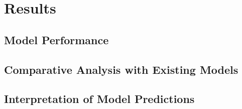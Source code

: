 \section{Results}

\subsection{Model Performance}
\label{sec:Model Performance}

\subsection{Comparative Analysis with Existing Models}
\label{sec:Comparative Analysis with Existing Models}

\subsection{Interpretation of Model Predictions}
\label{sec:Interpretation of Model Predictions}
